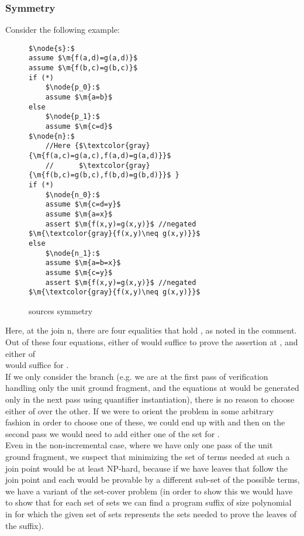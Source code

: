 \subsubsection{Symmetry}
Consider the following example:
\begin{figure}[H]
\begin{lstlisting}
$\node{s}:$
assume $\m{f(a,d)=g(a,d)}$
assume $\m{f(b,c)=g(b,c)}$
if (*)
	$\node{p_0}:$
	assume $\m{a=b}$
else
	$\node{p_1}:$
	assume $\m{c=d}$
$\node{n}:$
	//Here {$\textcolor{gray}{\m{f(a,c)=g(a,c),f(a,d)=g(a,d)}}$ 
	//      $\textcolor{gray}{\m{f(b,c)=g(b,c),f(b,d)=g(b,d)}}$ }
if (*)
	$\node{n_0}:$
	assume $\m{c=d=y}$
	assume $\m{a=x}$
	assert $\m{f(x,y)=g(x,y)}$ //negated $\m{\textcolor{gray}{f(x,y)\neq g(x,y)}}$
else
	$\node{n_1}:$
	assume $\m{a=b=x}$
	assume $\m{c=y}$
	assert $\m{f(x,y)=g(x,y)}$ //negated $\m{\textcolor{gray}{f(x,y)\neq g(x,y)}}$
\end{lstlisting}
\caption{sources symmetry}
\label{snippet3.16h}
\end{figure}
Here, at the join n, there are four equalities that hold , as noted in the comment.\\
Out of these four equations, either of  would suffice to prove the assertion at , 
and either of\\
  would suffice for .\\
If we only consider the branch  (e.g. we are at the first pass of verification handling only the unit ground fragment, and the equations at  would be generated only in the next pass using quantifier instantiation), there is no reason to choose either of 
 over the other. If we were to orient the problem in some arbitrary fashion in order to choose one of these,
we could end up with  and then on the second pass we would need to add either one of the set for .\\
Even in the non-incremental case, where we have only one pass of the unit ground fragment, 
we suspect that minimizing the set of terms needed at such a join point would be at least NP-hard, 
because if we have  leaves that follow the join point and each would be provable by a different sub-set of the possible terms, we have a variant of the set-cover problem (in order to show this we would have to show that for each set of sets we can find a program suffix of size polynomial in  for which the given set of sets represents the sets needed to prove the leaves of the suffix).\\
